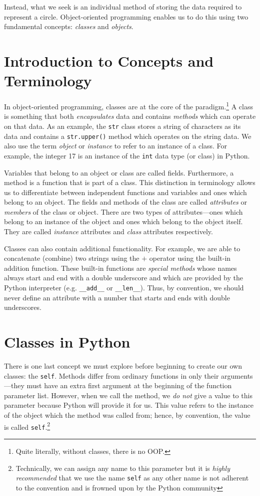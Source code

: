 \documentclass{cslesson}
\begin{document}
Instead, what we seek is an individual method of storing the data required to represent a circle. 
Object-oriented programming enables us to do this using two fundamental concepts: 
\textit{classes} and \textit{objects}.

\section{Introduction to Concepts and Terminology}

In object-oriented programming, classes are at the core of the paradigm.\footnote{Quite literally, without classes, there is no OOP.} 
A class is something that both \textit{encapsulates} data and contains \textit{methods} which can operate on that data. 
As an example, the \texttt{str} class stores a string of characters as its data and contains a \texttt{str.upper()} method which operates 
on the string data. We also use the term \textit{object} or \textit{instance} to refer to an instance of a class. 
For example, the integer 17 is an instance of the \texttt{int} data type (or class) in Python.

Variables that belong to an object or class are called fields. Furthermore, a method is a function that is part of a class. 
This distinction in terminology allows us to differentiate between independent functions and variables and ones which belong to an object. 
The fields and methods of the class are called \textit{attributes} or \textit{members} of the class or object. There are two types of attributes---ones 
which belong to an instance of the object and ones which belong to the object itself. They are called \textit{instance} attributes and \textit{class} 
attributes respectively.

Classes can also contain additional functionality. For example, we are able to concatenate (combine) two strings using the \texttt{$+$} operator
using the built-in addition function. These built-in functions are \textit{special methods} whose names always start and end with a double underscore
and which are provided by the Python interpreter (e.g. \texttt{\_\_add\_\_} or \texttt{\_\_len\_\_}). Thus, by convention, we should never define
an attribute with a number that starts and ends with double underscores.

\section{Classes in Python}

There is one last concept we must explore before beginning to create our own classes: the \texttt{self}. Methods differ from ordinary functions
in only their arguments---they must have an extra first argument at the beginning of the function parameter list. However, when we
call the method, we \textit{do not} give a value to this parameter because Python will provide it for us. This value refers to the instance of the 
object which the method was called from; hence, by convention, the value is called \texttt{self}.\footnote{Technically, we can assign any name to this
parameter but it is \textit{highly recommended} that we use the name \texttt{self} as any other name is not adherent to the convention and is frowned upon
by the Python community}
\end{document}
